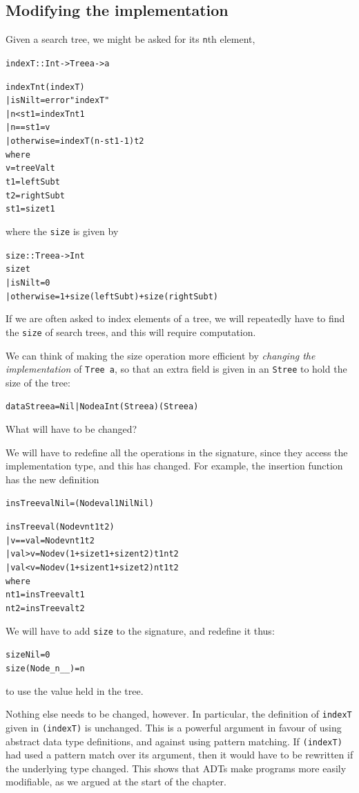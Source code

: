 \subsection*{Modifying the implementation}

Given a search tree, we might be asked for its \texttt{n}th element, 
\begin{alltt}
indexT :: Int -> Tree a -> a

indexT n t \hfill (indexT)
  | isNil t     = error "indexT"
  | n < st1     = indexT n t1  
  | n == st1    = v           
  | otherwise   = indexT (n-st1-1) t2 
    where
    v   = treeVal t
    t1  = leftSub t
    t2  = rightSub t
    st1 = size t1
\end{alltt}
where the \texttt{size} is given by
\begin{alltt}
size :: Tree a -> Int
size t 
  | isNil t     = 0
  | otherwise   = 1 + size (leftSub t) + size (rightSub t)
\end{alltt}
If we are often asked to index elements of a tree, we will repeatedly have to
find the \texttt{size} of search trees, and this will require computation.

We can think of making the size operation more efficient by {\em changing the 
implementation\/} of \texttt{Tree a}, so that an extra field is given in an
\texttt{Stree} to hold the size of the tree:
\begin{alltt}
data Stree a = Nil | Node a Int (Stree a) (Stree a)
\end{alltt}
What will have to be changed? 
\begin{titemize}
\item 
We will have to redefine all the operations in the signature, since
they access the implementation type, and this has changed. For example, the
insertion function has the new definition
\begin{alltt} 
insTree val Nil = (Node val 1 Nil Nil)

insTree val (Node v n t1 t2)
  | v==val      = Node v n t1 t2
  | val > v     = Node v (1 + size t1 + size nt2) t1 nt2
  | val < v     = Node v (1 + size nt1 + size t2) nt1 t2
    where
    nt1 = insTree val t1
    nt2 = insTree val t2
\end{alltt}
\item 
We will have to add \texttt{size} to the
signature, and redefine it thus:
\begin{alltt}
size Nil            = 0
size (Node _ n _ _) = n
\end{alltt}
to use the value held in the tree.
\end{titemize}
Nothing else needs to be changed, however. In particular, the definition of
\texttt{indexT} given in \texttt{(indexT)} is unchanged. This is a powerful argument
in favour of using abstract data type
definitions, and against using
pattern matching. If \texttt{(indexT)} had used a pattern match over its argument,
then it would have to be rewritten if the underlying type changed. This
shows that ADTs make programs more easily modifiable, as we argued
at the start of the chapter.

